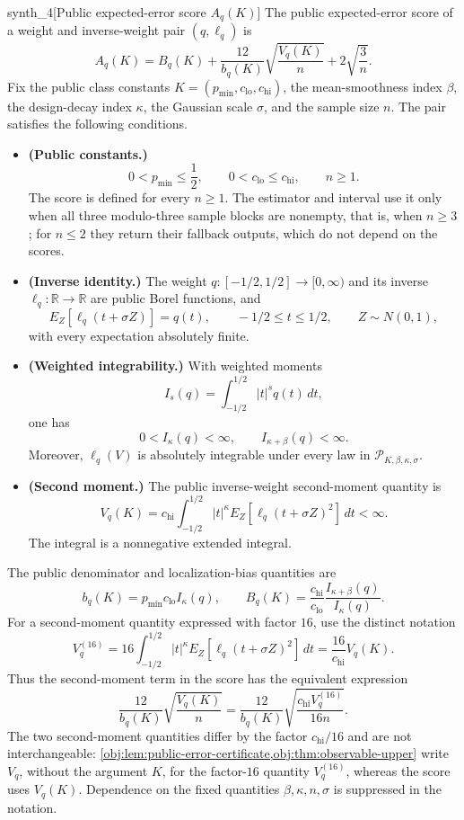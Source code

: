 \begin{definitionv}{synth_4}[Public expected-error score \(A_q(K)\)]
The public expected-error score of a weight and inverse-weight pair \((q,\ell_q)\) is
\[
A_q(K)
=
B_q(K)
+\frac{12}{b_q(K)}\sqrt{\frac{V_q(K)}{n}}
+2\sqrt{\frac3n}.
\]
Fix the public class constants \(K=(p_{\min},c_{\mathrm{lo}},c_{\mathrm{hi}})\), the mean-smoothness index \(\beta\), the design-decay index \(\kappa\), the Gaussian scale \(\sigma\), and the sample size \(n\). The pair satisfies the following conditions.
\begin{itemize}
\item \textbf{(Public constants.)}
\[
0<p_{\min}\le\frac12,
\qquad
0<c_{\mathrm{lo}}\le c_{\mathrm{hi}},
\qquad n\ge1.
\]
The score is defined for every \(n\ge1\). The estimator and interval use it only when all three modulo-three sample blocks are nonempty, that is, when \(n\ge3\); for \(n\le2\) they return their fallback outputs, which do not depend on the scores.
\item \textbf{(Inverse identity.)}
The weight \(q:[-1/2,1/2]\to[0,\infty)\) and its inverse \(\ell_q:\mathbb R\to\mathbb R\) are public Borel functions, and
\[
E_Z[\ell_q(t+\sigma Z)]=q(t),
\qquad -1/2\le t\le1/2,
\qquad Z\sim N(0,1),
\]
with every expectation absolutely finite.
\item \textbf{(Weighted integrability.)}
With weighted moments
\[
I_s(q)=\int_{-1/2}^{1/2}|t|^s q(t)\,dt,
\]
one has
\[
0<I_\kappa(q)<\infty,
\qquad
I_{\kappa+\beta}(q)<\infty.
\]
Moreover, \(\ell_q(V)\) is absolutely integrable under every law in \(\mathcal P_{K,\beta,\kappa,\sigma}\).
\item \textbf{(Second moment.)}
The public inverse-weight second-moment quantity is
\[
V_q(K)
=
c_{\mathrm{hi}}\int_{-1/2}^{1/2}
|t|^\kappa E_Z[\ell_q(t+\sigma Z)^2]\,dt
<\infty.
\]
The integral is a nonnegative extended integral.
\end{itemize}
The public denominator and localization-bias quantities are
\[
b_q(K)=p_{\min}c_{\mathrm{lo}}I_\kappa(q),
\qquad
B_q(K)=\frac{c_{\mathrm{hi}}}{c_{\mathrm{lo}}}
\frac{I_{\kappa+\beta}(q)}{I_\kappa(q)}.
\]
For a second-moment quantity expressed with factor \(16\), use the distinct notation
\[
V_q^{(16)}
=
16\int_{-1/2}^{1/2}|t|^\kappa
E_Z[\ell_q(t+\sigma Z)^2]\,dt
=
\frac{16}{c_{\mathrm{hi}}}V_q(K).
\]
Thus the second-moment term in the score has the equivalent expression
\[
\frac{12}{b_q(K)}\sqrt{\frac{V_q(K)}n}
=
\frac{12}{b_q(K)}
\sqrt{\frac{c_{\mathrm{hi}}V_q^{(16)}}{16n}}.
\]
The two second-moment quantities differ by the factor \(c_{\mathrm{hi}}/16\) and are not interchangeable: \cref{obj:lem:public-error-certificate,obj:thm:observable-upper} write \(V_q\), without the argument \(K\), for the factor-\(16\) quantity \(V_q^{(16)}\), whereas the score uses \(V_q(K)\).
Dependence on the fixed quantities \(\beta,\kappa,n,\sigma\) is suppressed in the notation.
\end{definitionv}

